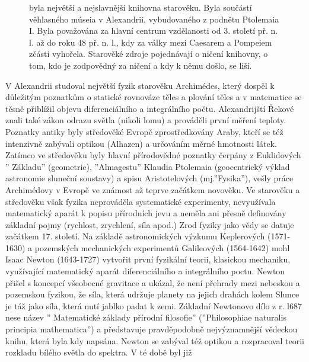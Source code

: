     \begin{figure}[ht!]  %
      \centering
      \caption{ \wikiAlexLib byla největší a nejslavnější knihovna starověku. Byla součástí
                věhlasného múseia v Alexandrii, vybudovaného z podnětu Ptolemaia I. Byla považována
                za hlavní centrum vzdělanosti od 3. století př. n. l. až do roku 48 př. n. l., kdy
                za války mezi Caesarem a Pompeiem zčásti vyhořela. Starověké zdroje pojednávají o
                ničení knihovny, o tom, kdo je zodpovědný za ničení a kdy k němu došlo, se liší.}
      \label{fyz:fig894}
    \end{figure} 

    V Alexandrii studoval největší fyzik starověku Archimédes, který dospěl k důležitým poznatkům o
    statické rovnováze těles a plování těles a v matematice se těsně přiblížil objevu
    diferenciálního a integrálního počtu. Alexandrijští Řekové znali také zákon odrazu světla
    (nikoli lomu) a prováděli první měření teploty. Poznatky antiky byly středověké Evropě
    zprostředkovány Araby, kteří se též intenzivně zabývali optikou (Alhazen) a určováním měrné
    hmotnosti látek. Zatímco ve středověku byly hlavní přírodovědné poznatky čerpány z Euklidových ”
    Základu” (geometrie), ”Almagestu” Klaudia Ptolemaia (geocentrický výklad astronomie sluneční
    soustavy) a spisu Aristotelových (mj.”Fysika”), vešly práce Archimédovy v Evropě ve známost až
    teprve začátkem novověku. Ve starověku a středověku však fyzika neprováděla systematické
    experimenty, nevyužívala matematický aparát k popisu přírodních jevu a neměla ani přesně
    definovány základní pojmy (rychlost, zrychlení, síla apod.) Zrod fyziky jako vědy se datuje
    začátkem 17. století. Na základě astronomických výzkumu Keplerových (1571-1630) a pozemských
    mechanických experimentů Galileových (1564-1642) mohl Isaac Newton (1643-1727) vytvořit první
    fyzikální teorii, klasickou mechaniku, využívající matematický aparát diferenciálního a
    integrálního poctu. Newton přišel s koncepcí všeobecné gravitace a ukázal, že není přehrady mezi
    nebeskou a pozemskou fyzikou, že síla, která udržuje planety na jejich drahách kolem Slunce je
    táž jako síla, která nutí jablko padat k zemi. Základní Newtonovo dílo z r. l687 nese název ”
    Matematické základy přírodní filosofie” (”Philosophiae naturalis principia mathematica”) a
    představuje pravděpodobně nejvýznamnější vědeckou knihu, která byla kdy napsána. Newton se
    zabýval též optikou a rozpracoval teorii rozkladu bílého světla do spektra. V té době byl již
